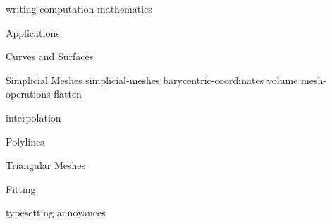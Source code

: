 {writing}
{computation}
{mathematics}
\begin{plSection}{Applications}
\begin{plSection}{Curves and Surfaces}
\begin{plSection}{Simplicial Meshes}
{simplicial-meshes}
{barycentric-coordinates}
{volume}
{mesh-operations}
{flatten}
\end{plSection}%
{interpolation}
\begin{plSection}{Polylines}
\end{plSection}%
\begin{plSection}{Triangular Meshes}
\end{plSection}%
\begin{plSection}{Fitting}
\end{plSection} %
\end{plSection} %
\end{plSection}%
{typesetting}
{annoyances}
